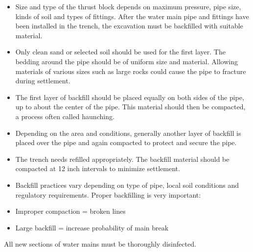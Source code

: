 \documentclass[10pt]{article}
\begin{document}
\begin{itemize}
  \item Size and type of the thrust block depends on maximum pressure, pipe size, kinds of soil and types of fittings. After the water main pipe and fittings have been installed in the trench, the excavation must be backfilled with suitable material.

  \item Only clean sand or selected soil should be used for the first layer. The bedding around the pipe should be of uniform size and material. Allowing materials of various sizes such as large rocks could cause the pipe to fracture during settlement.

  \item The first layer of backfill should be placed equally on both sides of the pipe, up to about the center of the pipe. This material should then be compacted, a process often called haunching.

  \item Depending on the area and conditions, generally another layer of backfill is placed over the pipe and again compacted to protect and secure the pipe.

  \item The trench needs refilled appropriately. The backfill material should be compacted at 12 inch intervals to minimize settlement.

  \item Backfill practices vary depending on type of pipe, local soil conditions and regulatory requirements. Proper backfilling is very important:

  \item Improper compaction = broken lines

  \item Large backfill = increase probability of main break

\end{itemize}
All new sections of water mains must be thoroughly disinfected.
\end{document}
